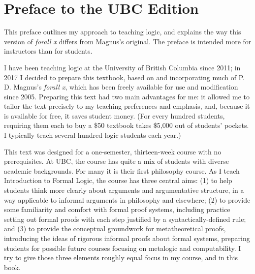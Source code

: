 \chapter*{Preface to the UBC Edition}
\label{ch.preface}


This preface outlines my approach to teaching logic, and explains the way this version of \emph{forall x} differs from Magnus's original. The preface is intended more for instructors than for students. 

I have been teaching logic at the University of British Columbia since 2011; in 2017 I decided to prepare this textbook, based on and incorporating much of P. D. Magnus's \emph{forall x}, which has been freely available for use and modification since 2005. Preparing this text had two main advantages for me: it allowed me to tailor the text precisely to my teaching preferences and emphasis, and, because it is available for free, it saves student money. (For every hundred students, requiring them each to buy a \$50 textbook takes \$5,000 out of students' pockets. I typically teach several hundred logic students each year.)

This text was designed for a one-semester, thirteen-week course with no prerequisites. At UBC, the course has quite a mix of students with diverse academic backgrounds. For many it is their first philosophy course. As I teach Introduction to Formal Logic, the course has three central aims: (1) to help students think more clearly about arguments and argumentative structure, in a way applicable to informal arguments in philosophy and elsewhere; (2) to provide some familiarity and comfort with formal proof systems, including practice setting out formal proofs with each step justified by a syntactically-defined rule; and (3) to provide the conceptual groundwork for metatheoretical proofs, introducing the ideas of rigorous informal proofs about formal systems, preparing students for possible future courses focusing on metalogic and computability. I try to give those three elements roughly equal focus in my course, and in this book.

